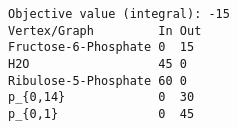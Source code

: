 \begin{verbatim}
Objective value (integral): -15
Vertex/Graph         In Out 
Fructose-6-Phosphate 0  15  
H2O                  45 0   
Ribulose-5-Phosphate 60 0   
p_{0,14}             0  30  
p_{0,1}              0  45  
\end{verbatim}
